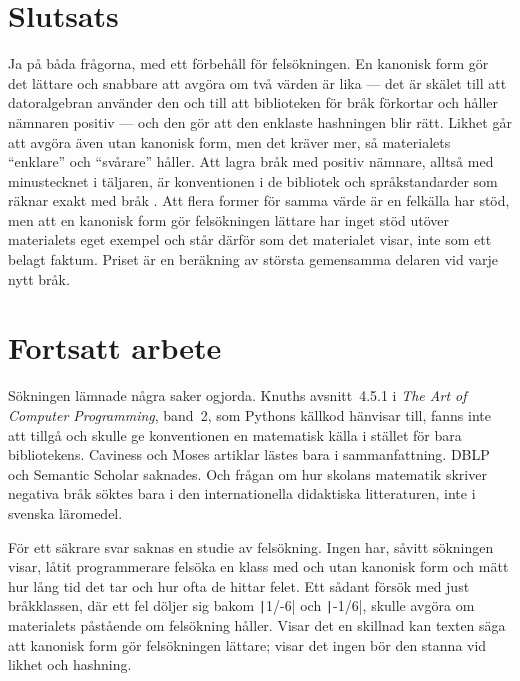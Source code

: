 \section{Slutsats}
\label{sec:kan-slutsats}

Ja på båda frågorna, med ett förbehåll för felsökningen.  En kanonisk
form gör det lättare och snabbare att avgöra om två värden är lika ---
det är skälet till att datoralgebran använder den
\autocite{RichStoutemyer2013,Price2022Hiding} och till att biblioteken
för bråk förkortar och håller nämnaren
positiv\autocite{GMPManual,PythonFractions} --- och den gör att den
enklaste hashningen blir rätt\autocite{PythonDataModel}.  Likhet går
att avgöra även utan kanonisk form, men det kräver mer, så materialets
\enquote{enklare} och \enquote{svårare} håller.  Att lagra bråk med
positiv nämnare, alltså med minustecknet i täljaren, är konventionen i
de bibliotek och språkstandarder som räknar exakt med bråk
\autocite{GMPManual,PythonFractions,CLHSRatio,R5RS1998}.  Att flera
former för samma värde är en felkälla har stöd\autocite{Kanade2010Representation},
men att en kanonisk form gör felsökningen lättare har inget stöd utöver
materialets eget exempel och står därför som det materialet visar,
inte som ett belagt faktum.  Priset är en beräkning av största
gemensamma delaren vid varje nytt bråk.

\section{Fortsatt arbete}
\label{sec:kan-fortsatt}

Sökningen lämnade några saker ogjorda.  Knuths avsnitt~4.5.1 i
\emph{The Art of Computer Programming}, band~2, som Pythons källkod
hänvisar till, fanns inte att tillgå och skulle ge konventionen en
matematisk källa i stället för bara bibliotekens.  Caviness och Moses
artiklar\autocite{Caviness1970,Moses1971} lästes bara i
sammanfattning.  DBLP och Semantic Scholar saknades.  Och frågan om
hur skolans matematik skriver negativa bråk söktes bara i den
internationella didaktiska litteraturen, inte i svenska läromedel.

För ett säkrare svar saknas en studie av felsökning.  Ingen har, såvitt
sökningen visar, låtit programmerare felsöka en klass med och utan
kanonisk form och mätt hur lång tid det tar och hur ofta de hittar
felet.  Ett sådant försök med just bråkklassen, där ett fel döljer sig
bakom \texttt|1/-6| och \texttt|-1/6|, skulle avgöra
om materialets påstående om felsökning håller.  Visar det en skillnad
kan texten säga att kanonisk form gör felsökningen lättare; visar det
ingen bör den stanna vid likhet och hashning.

